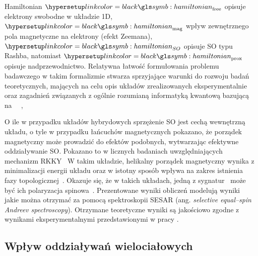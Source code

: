 Hamiltonian $\hatH_{\text{free}}$ opisuje elektrony swobodne w układzie 1D, $\hatH_{\text{mag}}$ wpływ zewnętrznego pola magnetyczne na elektrony (efekt Zeemana), $\hatH_{SO}$ opisuje \acrshort{SO} typu Rashba, natomiast $\hatH_{\text{prox}}$ opisuje nadprzewodnictwo.
Relatywna łatwość formułowania problemu badawczego w takim formalizmie stwarza sprzyjające warunki do rozwoju badań teoretycznych, mających na celu opis układów zrealizowanych eksperymentalnie~\cite{lutchyn.sau.2010,oreg.refael.2010,klinovaja.stano.2012,karzig.refael.2013,rainis.trifunovic.2013,li.chen.2014,vernek.penteado.2014,wakatsuki.ezawa.2014,heimes.mendler.2015,ruiz-tijerina.vernek.2015,maska.gorczyca.2017,maska.domanski.2017,ptok.kobialka.2017,liu.sau.2017,prada.aguado.2017,chevallier.szumniak.2018,padavic.hegde.2018,alecce.dellanna.2017,gau.plugge.2018,hua.chen.2019,kobialka.sedlmayr.2019,kobialka.ptok.2019,kobialka.domanski.2019,wille.egger.2019,schulenborg.flensberg.2020} oraz zagadnień związanych z ogólnie rozumianą informatyką kwantową bazującą na \MZM\ ~\cite{alicea.oreg.2011,vanheck.akhmerov.2012,fulga.vanheck.2013,vanheck.hyart.2015,karzig.oreg.2016,sekania.plugge.2017},


O ile w przypadku układów hybrydowych sprzężenie \acrshort{SO} jest cechą wewnętrzną układu, o tyle w przypadku łańcuchów magnetycznych pokazano, że porządek magnetyczny może prowadzić do efektów podobnych, wytwarzając efektywne oddziaływanie \acrshort{SO}.
Pokazano to w licznych badaniach uwzględniających mechanizm RKKY~\cite{braunecker.simon.2013,pientka.glazman.2013,klinovaja.stano.2013,kim.cheng.2014,braunecker.simon.2015,choy.edge.2011,nadj-perge.drozdov.2013}
W takim układzie, helikalny porządek magnetyczny wynika z minimalizacji energii układu oraz w istotny sposób wpływa na zakres istnienia fazy topologicznej~\cite{gorczyca-goraj.domanski.2019}. 
Okazuje się, że w takich układach, jedną z sygnatur \MZM\ może być ich polaryzacja spinowa~\cite{maska.gorczyca.2017,maska.domanski.2017}.
Prezentowane wyniki obliczeń modelują wyniki jakie można otrzymać za pomocą spektroskopii SESAR (ang. \textit{selective equal--spin Andreev spectroscopy}).
Otrzymane teoretyczne wyniki są jakościowo zgodne z wynikami eksperymentalnymi przedstawionymi w pracy \cite{jeon.xie.2017}.


\subsection*{Wpływ oddziaływań wielociałowych}

